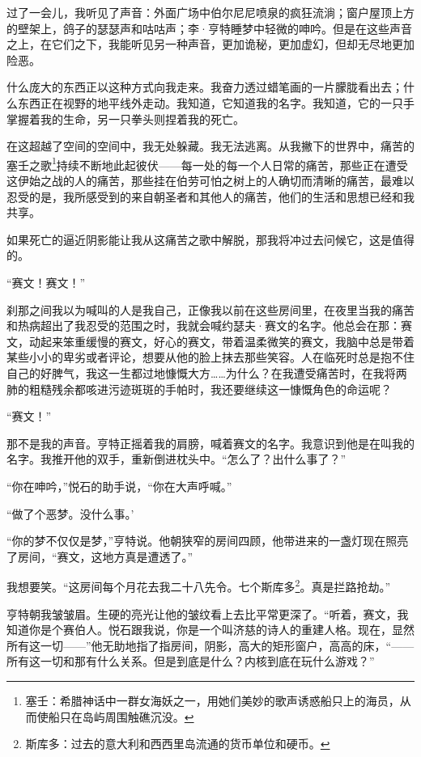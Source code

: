 \documentclass[AutoFakeBold=true]{book}
\begin{document}
过了一会儿，我听见了声音：外面广场中伯尔尼尼喷泉的疯狂流淌；窗户屋顶上方的壁架上，鸽子的瑟瑟声和咕咕声；李·亨特睡梦中轻微的呻吟。但是在这些声音之上，在它们之下，我能听见另一种声音，更加诡秘，更加虚幻，但却无尽地更加险恶。

什么庞大的东西正以这种方式向我走来。我奋力透过蜡笔画的一片朦胧看出去；什么东西正在视野的地平线外走动。我知道，它知道我的名字。我知道，它的一只手掌握着我的生命，另一只拳头则捏着我的死亡。

在这超越了空间的空间中，我无处躲藏。我无法逃离。从我撇下的世界中，痛苦的塞壬之歌\footnote{塞壬：希腊神话中一群女海妖之一，用她们美妙的歌声诱惑船只上的海员，从而使船只在岛屿周围触礁沉没。}持续不断地此起彼伏——每一处的每一个人日常的痛苦，那些正在遭受这伊始之战的人的痛苦，那些挂在伯劳可怕之树上的人确切而清晰的痛苦，最难以忍受的是，我所感受到的来自朝圣者和其他人的痛苦，他们的生活和思想已经和我共享。

如果死亡的逼近阴影能让我从这痛苦之歌中解脱，那我将冲过去问候它，这是值得的。

\vspace*{1em}

``赛文！赛文！''

刹那之间我以为喊叫的人是我自己，正像我以前在这些房间里，在夜里当我的痛苦和热病超出了我忍受的范围之时，我就会喊约瑟夫·赛文的名字。他总会在那：赛文，动起来笨重缓慢的赛文，好心的赛文，带着温柔微笑的赛文，我脑中总是带着某些小小的卑劣或者评论，想要从他的脸上抹去那些笑容。人在临死时总是抱不住自己的好脾气，我这一生都过地慷慨大方……为什么？在我遭受痛苦时，在我将两肺的粗糙残余都咳进污迹斑斑的手帕时，我还要继续这一慷慨角色的命运呢？

``赛文！''

那不是我的声音。亨特正摇着我的肩膀，喊着赛文的名字。我意识到他是在叫我的名字。我推开他的双手，重新倒进枕头中。``怎么了？出什么事了？''

``你在呻吟，''悦石的助手说，``你在大声呼喊。''

``做了个恶梦。没什么事。'

``你的梦不仅仅是梦，''亨特说。他朝狭窄的房间四顾，他带进来的一盏灯现在照亮了房间，``赛文，这地方真是遭透了。''

我想要笑。``这房间每个月花去我二十八先令。七个斯库多\footnote{斯库多：过去的意大利和西西里岛流通的货币单位和硬币。}。真是拦路抢劫。''

亨特朝我皱皱眉。生硬的亮光让他的皱纹看上去比平常更深了。``听着，赛文，我知道你是个赛伯人。悦石跟我说，你是一个叫济慈的诗人的重建人格。现在，显然所有这一切——''他无助地指了指房间，阴影，高大的矩形窗户，高高的床，``——所有这一切和那有什么关系。但是到底是什么？内核到底在玩什么游戏？''
\end{document}
